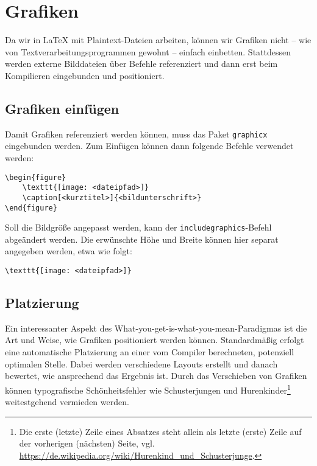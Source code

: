 \chapter{Grafiken}
\label{sec:graphics}

Da wir in \LaTeX{} mit Plaintext-Dateien arbeiten, können wir Grafiken nicht – wie von Textverarbeitungsprogrammen gewohnt – einfach einbetten.
Stattdessen werden externe Bilddateien über Befehle referenziert und dann erst beim Kompilieren eingebunden und positioniert.

\section{Grafiken einfügen}
\label{sec:display-graphics}
Damit Grafiken referenziert werden können, muss das Paket \texttt{graphicx} eingebunden werden. Zum Einfügen können dann folgende Befehle verwendet werden:  

\begin{verbatim}
\begin{figure}
	\texttt{[image: <dateipfad>]}
	\caption[<kurztitel>]{<bildunterschrift>}
\end{figure}
\end{verbatim}

\noindent Soll die Bildgröße angepasst werden, kann der \texttt{includegraphics}-Befehl abgeändert werden. 
Die erwünschte Höhe und Breite können hier separat angegeben werden, etwa wie folgt: 

\begin{verbatim}
\texttt{[image: <dateipfad>]}
\end{verbatim}

\section{Platzierung}
\label{sec:graphics-placement}
Ein interessanter Aspekt des What-you-get-is-what-you-mean-Paradigmas ist die Art und Weise, wie Grafiken positioniert werden können. 
Standardmäßig erfolgt eine automatische Platzierung an einer vom Compiler berechneten, potenziell optimalen Stelle.
Dabei werden verschiedene Layouts erstellt und danach bewertet, wie ansprechend das Ergebnis ist.
Durch das Verschieben von Grafiken können typografische Schönheitsfehler wie Schusterjungen und Hurenkinder\footnote{Die erste (letzte) Zeile eines Absatzes steht allein als letzte (erste) Zeile auf der vorherigen (nächsten) Seite, vgl. \url{https://de.wikipedia.org/wiki/Hurenkind_und_Schusterjunge}.} weitestgehend vermieden werden. 

